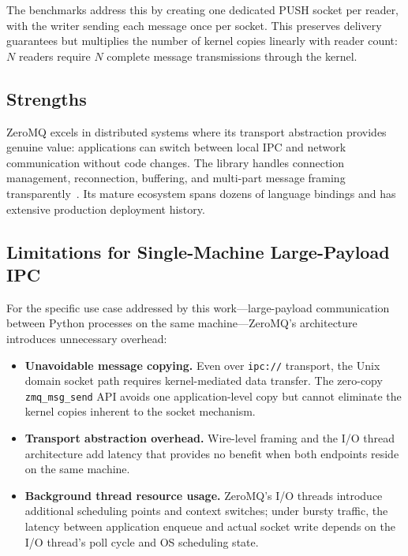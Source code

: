The benchmarks address this by creating one dedicated PUSH socket per reader, with the writer sending each message once per socket. This preserves delivery guarantees but multiplies the number of kernel copies linearly with reader count: $N$ readers require $N$ complete message transmissions through the kernel.

\subsection{Strengths}

ZeroMQ excels in distributed systems where its transport abstraction provides genuine value: applications can switch between local IPC and network communication without code changes. The library handles connection management, reconnection, buffering, and multi-part message framing transparently~\cite{zeromq2013}. Its mature ecosystem spans dozens of language bindings and has extensive production deployment history.

\subsection{Limitations for Single-Machine Large-Payload IPC}

For the specific use case addressed by this work---large-payload communication between Python processes on the same machine---ZeroMQ's architecture introduces unnecessary overhead:

\begin{itemize}
    \item \textbf{Unavoidable message copying.} Even over \texttt{ipc://} transport, the Unix domain socket path requires kernel-mediated data transfer. The zero-copy \texttt{zmq\_msg\_send} API avoids one application-level copy but cannot eliminate the kernel copies inherent to the socket mechanism.

    \item \textbf{Transport abstraction overhead.} Wire-level framing and the I/O thread architecture add latency that provides no benefit when both endpoints reside on the same machine.

    \item \textbf{Background thread resource usage.} ZeroMQ's I/O threads introduce additional scheduling points and context switches; under bursty traffic, the latency between application enqueue and actual socket write depends on the I/O thread's poll cycle and OS scheduling state.
\end{itemize}


